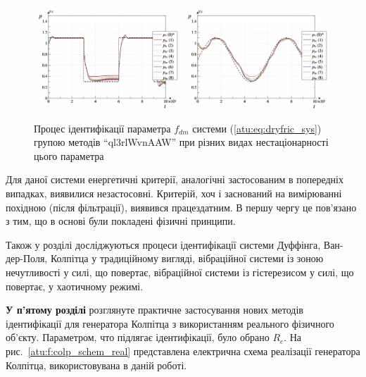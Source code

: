 \documentclass[a4paper,13pt]{atuaref}
\begin{document}
\begin{figure}[htb!]
\centerline{
  \includegraphics[width=0.49\textwidth]{p5/p/cha/fric/ql3rlWvnAAW/fric_id-p_t_p_ql3rlWvnAAW_sign_xl.png}
  \hfill
  \includegraphics[width=0.49\textwidth]{p5/p/cha/fric/ql3rlWvnAAW/fric_id-p_t_p_ql3rlWvnAAW_sin_xl.png}
}
\caption{
  Процес ідентифікації параметра $f_{dm}$ системи (\ref{atu:eq:dryfric_sys}) групою методів ``ql3rlWvnAAW'' при різних видах нестаціонарності цього параметра
}
\label{atu:f:fric_id}
\end{figure}

Для даної системи енергетичні критерії, аналогічні застосованим в попередніх
випадках, виявилися незастосовні. Критерій, хоч і заснований на вимірюванні
похідною (після фільтрації), виявився працездатним. В першу чергу це пов'язано
з тим, що в основі були покладені фізичні принципи.


Також у розділі досліджуються процеси ідентифікації системи Дуффінга, Ван-дер-Поля,
Колпітца у традиційному вигляді, вібраційної системи
із зоною нечутливості у силі, що повертає, вібраційної системи
із гістерезисом у силі, що повертає, у хаотичному режимі.


\textbf{У п'ятому розділі}
розглянуте практичне застосування
нових методів ідентифікації для генератора Колпітца
з використанням реального фізичного об'єкту.
Параметром, что підлягає ідентифікації, було обрано $R_c$.
На рис.~\ref{atu:f:colp_schem_real} представлена електрична схема реалізації
генератора Колпітца, використовувана в даній роботі.
\end{document}
